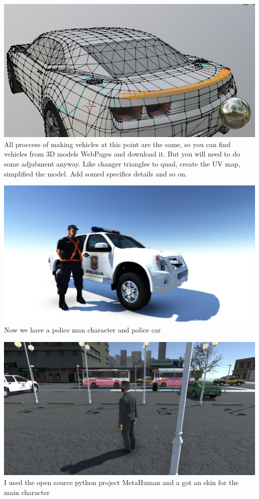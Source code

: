 \documentclass{article}
\begin{document}
  \includegraphics[width=\textwidth]{34.png}
  All proccess of making vehicles at this point are the same, so you can find vehicles from 3D models WebPages and download it. But you will need to do some adjubment anyway. Like changer triangles to quad, create the UV map, simplified the model. Add somed specifics details and so on.
  
  \includegraphics[width=\textwidth]{38.jpg}
  Now we have a police man character and police car
  
  \includegraphics[width=\textwidth]{57.jpg}
  I used the open source python project MetaHuman and a got an skin for the main character
\end{document}

